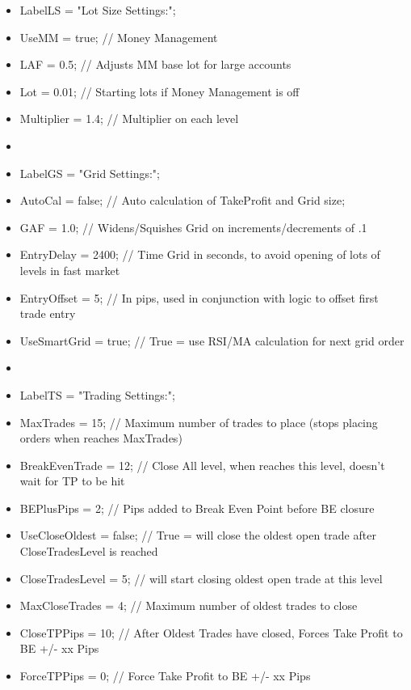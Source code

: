 \begin{itemize}
\item LabelLS             = "Lot Size Settings:";
\item UseMM               = true;    // Money Management
\item LAF                 = 0.5;      // Adjusts MM base lot for large accounts
\item Lot                 = 0.01;     // Starting lots if Money Management is off
\item Multiplier          = 1.4;      // Multiplier on each level
\item 
\item LabelGS             = "Grid Settings:";
\item AutoCal             = false;    // Auto calculation of TakeProfit and Grid size;
\item GAF                 = 1.0;      // Widens/Squishes Grid on increments/decrements of .1
\item EntryDelay          = 2400;     // Time Grid in seconds, to avoid opening of lots of levels in fast market
\item EntryOffset         = 5;        // In pips, used in conjunction with logic to offset first trade entry
\item UseSmartGrid        = true;     // True = use RSI/MA calculation for next grid order
\item 
\item LabelTS             = "Trading Settings:";
\item MaxTrades           = 15;       // Maximum number of trades to place (stops placing orders when reaches MaxTrades)
\item BreakEvenTrade      = 12;       // Close All level, when reaches this level, doesn't wait for TP to be hit
\item BEPlusPips          = 2;        // Pips added to Break Even Point before BE closure
\item UseCloseOldest      = false;    // True = will close the oldest open trade after CloseTradesLevel is reached
\item CloseTradesLevel    = 5;        // will start closing oldest open trade at this level
\item MaxCloseTrades      = 4;        // Maximum number of oldest trades to close
\item CloseTPPips         = 10;       // After Oldest Trades have closed, Forces Take Profit to BE +/- xx Pips
\item ForceTPPips         = 0;        // Force Take Profit to BE +/- xx Pips

\end{itemize}

